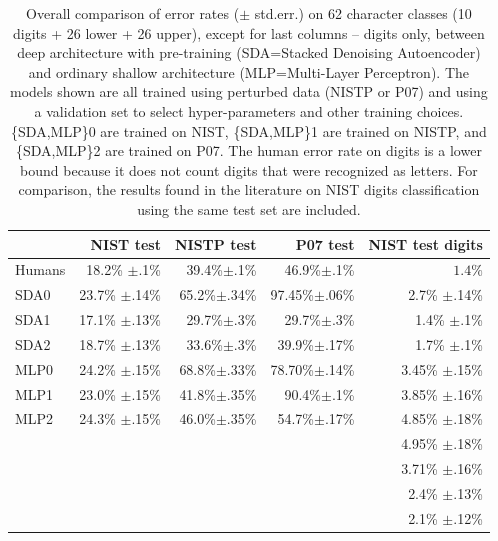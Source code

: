 \documentclass{article} %
\begin{document}
\begin{table}[ht]
\caption{Overall comparison of error rates ($\pm$ std.err.) on 62 character classes (10 digits +
26 lower + 26 upper), except for last columns -- digits only, between deep architecture with pre-training
(SDA=Stacked Denoising Autoencoder) and ordinary shallow architecture 
(MLP=Multi-Layer Perceptron). The models shown are all trained using perturbed data (NISTP or P07)
and using a validation set to select hyper-parameters and other training choices. 
\{SDA,MLP\}0 are trained on NIST,
\{SDA,MLP\}1 are trained on NISTP, and \{SDA,MLP\}2 are trained on P07.
The human error rate on digits is a lower bound because it does not count digits that were
recognized as letters. For comparison, the results found in the literature
on NIST digits classification using the same test set are included.}
\label{tab:sda-vs-mlp-vs-humans}
\begin{center}
\begin{tabular}{|l|r|r|r|r|} \hline
      & NIST test          & NISTP test       & P07 test       & NIST test digits   \\ \hline
Humans&   18.2\% $\pm$.1\%   &  39.4\%$\pm$.1\%   &  46.9\%$\pm$.1\%  &  $1.4\%$ \\ \hline 
SDA0   &  23.7\% $\pm$.14\%  &  65.2\%$\pm$.34\%  & 97.45\%$\pm$.06\%  & 2.7\% $\pm$.14\%\\ \hline 
SDA1   &  17.1\% $\pm$.13\%  &  29.7\%$\pm$.3\%  & 29.7\%$\pm$.3\%  & 1.4\% $\pm$.1\%\\ \hline 
SDA2   &  18.7\% $\pm$.13\%  &  33.6\%$\pm$.3\%  & 39.9\%$\pm$.17\%  & 1.7\% $\pm$.1\%\\ \hline 
MLP0   &  24.2\% $\pm$.15\%  & 68.8\%$\pm$.33\%  & 78.70\%$\pm$.14\%  & 3.45\% $\pm$.15\% \\ \hline 
MLP1   &  23.0\% $\pm$.15\%  &  41.8\%$\pm$.35\%  & 90.4\%$\pm$.1\%  & 3.85\% $\pm$.16\% \\ \hline 
MLP2   &  24.3\% $\pm$.15\%  &  46.0\%$\pm$.35\%  & 54.7\%$\pm$.17\%  & 4.85\% $\pm$.18\% \\ \hline 
\citep{Granger+al-2007} &     &                    &                   & 4.95\% $\pm$.18\% \\ \hline
\citep{Cortes+al-2000} &      &                    &                   & 3.71\% $\pm$.16\% \\ \hline
\citep{Oliveira+al-2002} &    &                    &                   & 2.4\% $\pm$.13\% \\ \hline
\citep{Milgram+al-2005} &      &                    &                   & 2.1\% $\pm$.12\% \\ \hline
\end{tabular}
\end{center}
\end{table}
\end{document}
